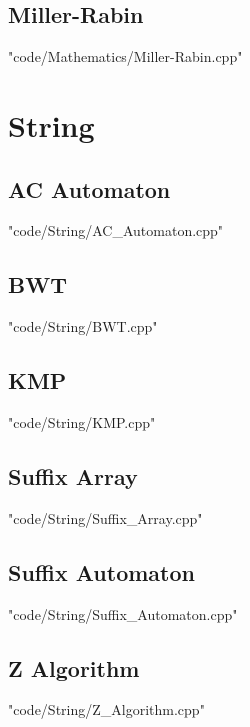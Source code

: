 \documentclass [landscape,8pt,a4paper,twocolumn]{article}
\begin{document}
\subsection{Miller-Rabin}
 {"code/Mathematics/Miller-Rabin.cpp"}
\section{String}
\subsection{AC Automaton}
 {"code/String/AC_Automaton.cpp"}
\subsection{BWT}
 {"code/String/BWT.cpp"}
\subsection{KMP}
 {"code/String/KMP.cpp"}
\subsection{Suffix Array}
 {"code/String/Suffix_Array.cpp"}
\subsection{Suffix Automaton}
 {"code/String/Suffix_Automaton.cpp"}
\subsection{Z Algorithm}
 {"code/String/Z_Algorithm.cpp"}


\end{document}
